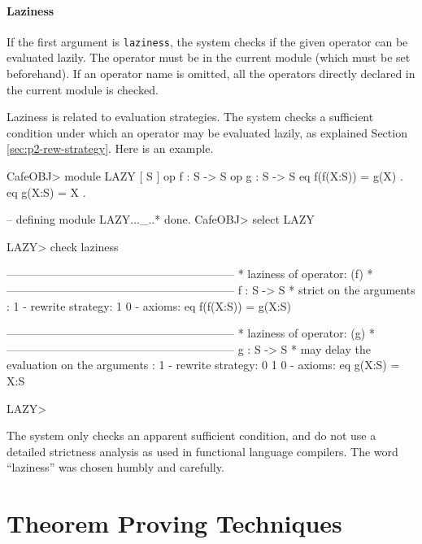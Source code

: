 \documentclass[a4paper]{memoir}
\begin{document}
\paragraph{Laziness}

If the first argument is \verb|laziness|,
the system checks if the given operator can be evaluated lazily.
The operator must be in the current module (which must be set
beforehand). If an operator name is omitted, all the operators
directly declared in the current module is checked.

Laziness is related to evaluation strategies.
The system checks a sufficient
condition under which an operator may be evaluated lazily,
as explained Section \ref{sec:p2-rew-strategy}. Here is an example.
\begin{vvtm}
\begin{ccode}
  CafeOBJ> module LAZY {
    [ S ]
    op f : S -> S
    op g : S -> S
    eq f(f(X:S)) = g(X) .
    eq g(X:S) = X .
  }

  -- defining module LAZY..._..* done.
  CafeOBJ> select LAZY

  LAZY> check laziness

  ------------------------------------------------------------
                 * laziness of operator: (f) *
  ------------------------------------------------------------
  f : S -> S
    * strict on the arguments :  1
    - rewrite strategy: 1 0
    - axioms:
      eq f(f(X:S)) = g(X:S)

  ------------------------------------------------------------
                 * laziness of operator: (g) *
  ------------------------------------------------------------
  g : S -> S
    * may delay the evaluation on the arguments :  1
    - rewrite strategy: 0 1 0
    - axioms:
      eq g(X:S) = X:S

  LAZY> 
\end{ccode}
\end{vvtm}

\begin{warning}
  The system only checks an apparent sufficient condition, and
  do not use a detailed strictness analysis as used in
  functional language compilers. The word ``laziness'' was chosen
  humbly and carefully.
\end{warning}

\section{Theorem Proving Techniques}\label{sec:p2-theorem-proving-exs}
\end{document}

